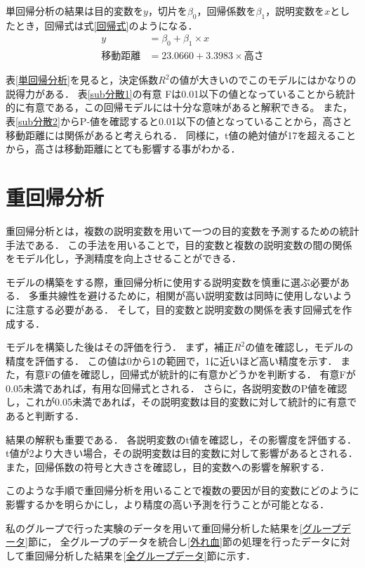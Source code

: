 \documentclass[titlepage,a4paper]{jsarticle}
\begin{document}
単回帰分析の結果は目的変数を$y$，切片を$\beta_{0}$，回帰係数を$\beta_{1}$，説明変数を$x$としたとき，回帰式は式\eqref{回帰式}のようになる．
\begin{align}
  y    & = \beta_{0} + \beta_{1} \times x         \\
  移動距離 & = 23.0660 + 3.3983 \times 高さ \label{回帰式}
\end{align}

表\ref{単回帰分析}を見ると，決定係数$R^{2}$の値が大きいのでこのモデルにはかなりの説得力がある．
表\ref{sub分散1}の有意 Fは0.01以下の値となっていることから統計的に有意である，この回帰モデルには十分な意味があると解釈できる。
また，表\ref{sub分散2}からP-値を確認すると0.01以下の値となっていることから，高さと移動距離には関係があると考えられる．
同様に，t値の絶対値が17を超えることから，高さは移動距離にとても影響する事がわかる．

\section{重回帰分析}%
重回帰分析とは，複数の説明変数を用いて一つの目的変数を予測するための統計手法である．
この手法を用いることで，目的変数と複数の説明変数の間の関係をモデル化し，予測精度を向上させることができる．

モデルの構築をする際，重回帰分析に使用する説明変数を慎重に選ぶ必要がある．
多重共線性を避けるために，相関が高い説明変数は同時に使用しないように注意する必要がある．
そして，目的変数と説明変数の関係を表す回帰式を作成する．

モデルを構築した後はその評価を行う．
まず，補正$R^{2}$の値を確認し，モデルの精度を評価する．
この値は0から1の範囲で，1に近いほど高い精度を示す．
また，有意Fの値を確認し，回帰式が統計的に有意かどうかを判断する．
有意Fが0.05未満であれば，有用な回帰式とされる．
さらに，各説明変数のP値を確認し，これが0.05未満であれば，その説明変数は目的変数に対して統計的に有意であると判断する．

結果の解釈も重要である．
各説明変数のt値を確認し，その影響度を評価する．
t値が2より大きい場合，その説明変数は目的変数に対して影響があるとされる．
また，回帰係数の符号と大きさを確認し，目的変数への影響を解釈する．

このような手順で重回帰分析を用いることで複数の要因が目的変数にどのように影響するかを明らかにし，より精度の高い予測を行うことが可能となる．

私のグループで行った実験のデータを用いて重回帰分析した結果を\ref{グループデータ}節に，
全グループのデータを統合し\ref{外れ血}節の処理を行ったデータに対して重回帰分析した結果を\ref{全グループデータ}節に示す．
\end{document}
